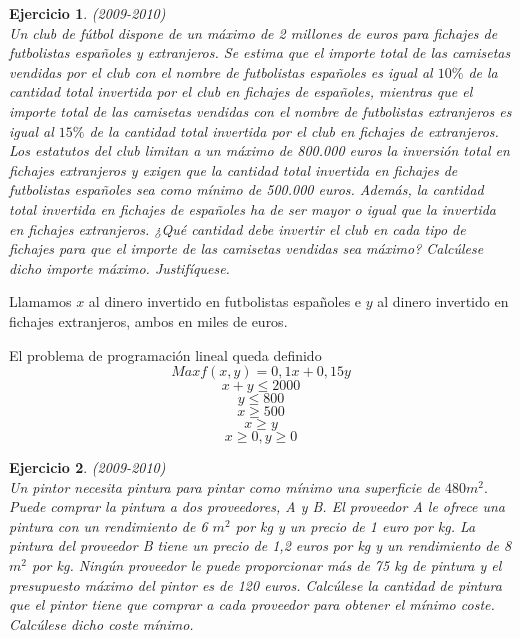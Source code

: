 \documentclass[12pt, a4paper]{amsart}
\newtheorem{ejer}{Ejercicio}
\newcommand{\s}{\color[rgb]{0,0,0.5}}
\newcommand{\n}{\color[rgb]{0,0,0}}
\begin{document}
\begin{ejer}\em  (2009-2010)\\
Un club de fútbol dispone de un máximo de 2 millones de euros para fichajes de futbolistas españoles y extranjeros. Se estima que el importe total de las camisetas vendidas por el club con el nombre de futbolistas españoles es igual al $10\%$ de la cantidad total invertida por el club en fichajes de españoles, mientras que el importe total de las camisetas vendidas con el nombre de futbolistas extranjeros es igual al $15\%$ de la cantidad total invertida por el club en fichajes de extranjeros. Los estatutos del club limitan a un máximo de 800.000 euros la inversión total en fichajes extranjeros y exigen que la cantidad total invertida en fichajes de futbolistas españoles sea como mínimo de 500.000 euros. Además, la cantidad total invertida en fichajes de españoles ha de ser mayor o igual que la invertida en fichajes extranjeros. ¿Qué cantidad debe invertir el club en cada tipo de fichajes para que el importe de las camisetas vendidas sea máximo? Calcúlese dicho importe máximo. Justifíquese.
\end{ejer}
\s
Llamamos $x$ al dinero invertido en futbolistas españoles e $y$ al dinero invertido en fichajes extranjeros, ambos en miles de euros.

El problema de programación lineal queda definido
\[Max f(x,y)= 0,1x+0,15y\]
\[x+y\leqslant 2000\]
\[y\leqslant 800\]
\[x\geqslant 500\]
\[x\geqslant y\]
\[x\geqslant 0, y\geqslant 0\]







\n

\begin{ejer}\em  (2009-2010)\\
Un pintor necesita pintura para pintar como mínimo una superficie de $480 m^2.$ Puede comprar la pintura a dos proveedores, A y B. El proveedor A le ofrece una pintura con un rendimiento de 6 $m^2$ por kg y un precio de 1 euro por kg. La pintura del proveedor B tiene un precio de 1,2 euros por kg y un rendimiento de 8 $m^2$ por kg. Ningún proveedor le puede proporcionar más de 75 kg de pintura y el presupuesto máximo del pintor es de 120 euros. Calcúlese la cantidad de pintura que el pintor tiene que comprar a cada proveedor para obtener el mínimo coste. Calcúlese dicho coste mínimo. 
\end{ejer}
\s
\end{document}
